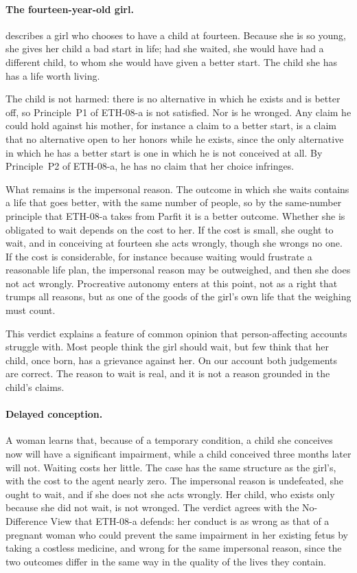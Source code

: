 \documentclass{situationist-preprint}
\begin{document}
\paragraph{The fourteen-year-old girl.} \citet[ch.~16]{Parfit1984} describes a girl who chooses to have a child at fourteen. Because she is so young, she gives her child a bad start in life; had she waited, she would have had a different child, to whom she would have given a better start. The child she has has a life worth living.

The child is not harmed: there is no alternative in which he exists and is better off, so Principle~P1 of ETH-08-a is not satisfied. Nor is he wronged. Any claim he could hold against his mother, for instance a claim to a better start, is a claim that no alternative open to her honors while he exists, since the only alternative in which he has a better start is one in which he is not conceived at all. By Principle~P2 of ETH-08-a, he has no claim that her choice infringes.

What remains is the impersonal reason. The outcome in which she waits contains a life that goes better, with the same number of people, so by the same-number principle that ETH-08-a takes from Parfit it is a better outcome. Whether she is obligated to wait depends on the cost to her. If the cost is small, she ought to wait, and in conceiving at fourteen she acts wrongly, though she wrongs no one. If the cost is considerable, for instance because waiting would frustrate a reasonable life plan, the impersonal reason may be outweighed, and then she does not act wrongly. Procreative autonomy enters at this point, not as a right that trumps all reasons, but as one of the goods of the girl's own life that the weighing must count.

This verdict explains a feature of common opinion that person-affecting accounts struggle with. Most people think the girl should wait, but few think that her child, once born, has a grievance against her. On our account both judgements are correct. The reason to wait is real, and it is not a reason grounded in the child's claims.

\paragraph{Delayed conception.} A woman learns that, because of a temporary condition, a child she conceives now will have a significant impairment, while a child conceived three months later will not. Waiting costs her little. The case has the same structure as the girl's, with the cost to the agent nearly zero. The impersonal reason is undefeated, she ought to wait, and if she does not she acts wrongly. Her child, who exists only because she did not wait, is not wronged. The verdict agrees with the No-Difference View that ETH-08-a defends: her conduct is as wrong as that of a pregnant woman who could prevent the same impairment in her existing fetus by taking a costless medicine, and wrong for the same impersonal reason, since the two outcomes differ in the same way in the quality of the lives they contain.
\end{document}
